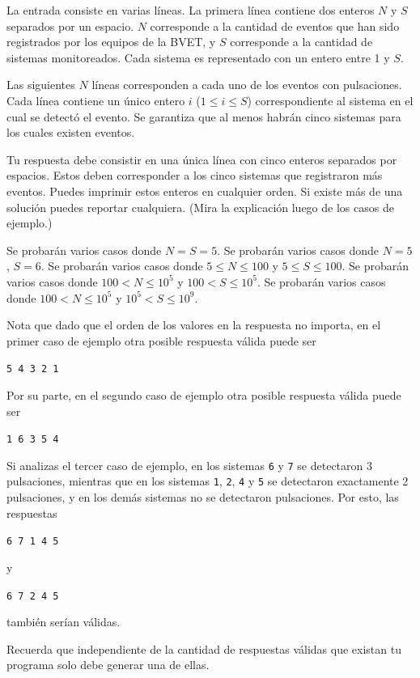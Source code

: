 \documentclass{oci}
\begin{document}
\begin{inputDescription}
La entrada consiste en varias líneas.
La primera línea contiene dos enteros $N$ y $S$ separados por un espacio.
$N$ corresponde a la cantidad de eventos que han sido registrados por los equipos de la BVET, y
$S$ corresponde a la cantidad de sistemas monitoreados.
Cada sistema es representado con un entero entre 1 y $S$.

Las siguientes $N$ líneas corresponden a cada uno de los eventos con pulsaciones.
Cada línea contiene un único entero $i$ ($1 \le i \le S$) correspondiente al sistema en el cual se detectó el evento.
Se garantiza que al menos habrán cinco sistemas para los cuales existen eventos.
\end{inputDescription}

\begin{outputDescription}
  Tu respuesta debe consistir en una única línea con cinco enteros separados por espacios.
  Estos deben corresponder a los cinco sistemas que registraron más eventos.
  Puedes imprimir estos enteros en cualquier orden.
  Si existe más de una solución puedes reportar cualquiera. (Mira la explicación luego de los casos de ejemplo.)
\end{outputDescription}

\begin{scoreDescription}
   Se probarán varios casos donde $N=S=5$.
   Se probarán varios casos donde $N=5$, $S=6$.
   Se probarán varios casos donde $5 \le N \le 100$ y $5 \le S \le 100$.
   Se probarán varios casos donde $100 < N \le 10^5$ y $100 < S \le 10^5$.
   Se probarán varios casos donde $100 < N \le 10^5$ y $10^5 < S \le 10^9$.
\end{scoreDescription}

\begin{sampleDescription}
\end{sampleDescription}

Nota que dado que el orden de los valores en la respuesta no importa, en el primer caso de ejemplo otra 
posible respuesta v\'alida puede ser
\begin{center}
\texttt{5 4 3 2 1}
\end{center}
Por su parte, en el segundo caso de ejemplo otra posible respuesta v\'alida puede ser
\begin{center}
\texttt{1 6 3 5 4}
\end{center}

Si analizas el tercer caso de ejemplo, en los sistemas \texttt{6} y \texttt{7} se detectaron
3 pulsaciones, mientras que en los sistemas \texttt{1}, \texttt{2}, \texttt{4} y \texttt{5} 
se detectaron exactamente 2 pulsaciones, y en los demás sistemas no se detectaron pulsaciones. 
Por esto, las respuestas 
\begin{center}
\texttt{6 7 1 4 5}
\end{center}
y
\begin{center}
\texttt{6 7 2 4 5}
\end{center}
también serían válidas. 

Recuerda que independiente de la cantidad de respuestas válidas que existan tu programa
solo debe generar una de ellas.
\end{document}
